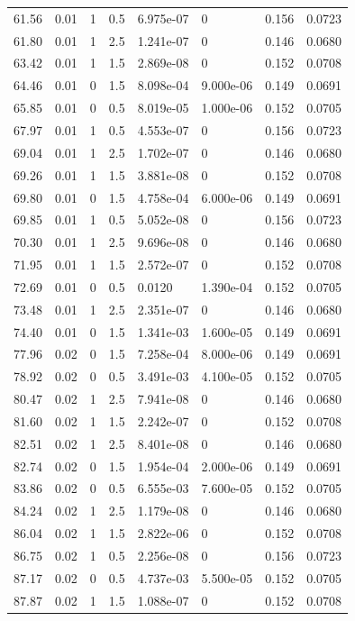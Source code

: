 \documentclass[preview]{standalone}
\begin{document}
{{{\begin{tabular}{L{1.2cm}C{1.2cm} C{0.3cm}C{0.5cm} C{1.4cm}C{1.4cm} C{1.4cm}C{1.4cm}}
  61.56  &  0.01  & 1     & 0.5 &  6.975e-07  & 0  & 0.156 &  0.0723   \\ 
  61.80  &  0.01  & 1     & 2.5 &  1.241e-07  & 0  & 0.146 &  0.0680   \\ 
  63.42  &  0.01  & 1     & 1.5 &  2.869e-08  & 0  & 0.152 &  0.0708   \\ 
  64.46  &  0.01  & 0     & 1.5 &  8.098e-04  & 9.000e-06  & 0.149 &  0.0691   \\ 
  65.85  &  0.01  & 0     & 0.5 &  8.019e-05  & 1.000e-06  & 0.152 &  0.0705   \\ 
  67.97  &  0.01  & 1     & 0.5 &  4.553e-07  & 0  & 0.156 &  0.0723   \\ 
  69.04  &  0.01  & 1     & 2.5 &  1.702e-07  & 0  & 0.146 &  0.0680   \\ 
  69.26  &  0.01  & 1     & 1.5 &  3.881e-08  & 0  & 0.152 &  0.0708   \\ 
  69.80  &  0.01  & 0     & 1.5 &  4.758e-04  & 6.000e-06  & 0.149 &  0.0691   \\ 
  69.85  &  0.01  & 1     & 0.5 &  5.052e-08  & 0  & 0.156 &  0.0723   \\ 
  70.30  &  0.01  & 1     & 2.5 &  9.696e-08  & 0  & 0.146 &  0.0680   \\ 
  71.95  &  0.01  & 1     & 1.5 &  2.572e-07  & 0  & 0.152 &  0.0708   \\ 
  72.69  &  0.01  & 0     & 0.5 &  0.0120  & 1.390e-04  & 0.152 &  0.0705   \\ 
  73.48  &  0.01  & 1     & 2.5 &  2.351e-07  & 0  & 0.146 &  0.0680   \\ 
  74.40  &  0.01  & 0     & 1.5 &  1.341e-03  & 1.600e-05  & 0.149 &  0.0691   \\ 
  77.96  &  0.02  & 0     & 1.5 &  7.258e-04  & 8.000e-06  & 0.149 &  0.0691   \\ 
  78.92  &  0.02  & 0     & 0.5 &  3.491e-03  & 4.100e-05  & 0.152 &  0.0705   \\ 
  80.47  &  0.02  & 1     & 2.5 &  7.941e-08  & 0  & 0.146 &  0.0680   \\ 
  81.60  &  0.02  & 1     & 1.5 &  2.242e-07  & 0  & 0.152 &  0.0708   \\ 
  82.51  &  0.02  & 1     & 2.5 &  8.401e-08  & 0  & 0.146 &  0.0680   \\ 
  82.74  &  0.02  & 0     & 1.5 &  1.954e-04  & 2.000e-06  & 0.149 &  0.0691   \\ 
  83.86  &  0.02  & 0     & 0.5 &  6.555e-03  & 7.600e-05  & 0.152 &  0.0705   \\ 
  84.24  &  0.02  & 1     & 2.5 &  1.179e-08  & 0  & 0.146 &  0.0680   \\ 
  86.04  &  0.02  & 1     & 1.5 &  2.822e-06  & 0  & 0.152 &  0.0708   \\ 
  86.75  &  0.02  & 1     & 0.5 &  2.256e-08  & 0  & 0.156 &  0.0723   \\ 
  87.17  &  0.02  & 0     & 0.5 &  4.737e-03  & 5.500e-05  & 0.152 &  0.0705   \\ 
  87.87  &  0.02  & 1     & 1.5 &  1.088e-07  & 0  & 0.152 &  0.0708   \\ 
\hline 
\end{tabular} 

}}}
\end{document}
